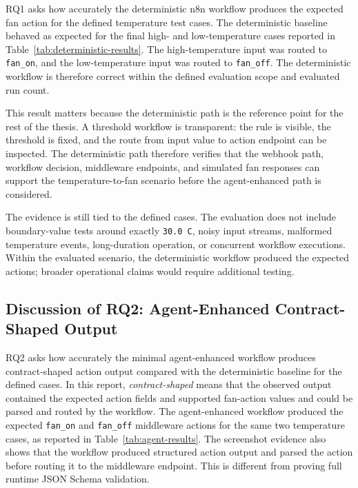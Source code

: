 RQ1 asks how accurately the deterministic n8n workflow produces the expected fan action for the defined temperature test cases. The deterministic baseline behaved as expected for the final high- and low-temperature cases reported in Table~\ref{tab:deterministic-results}. The high-temperature input was routed to \texttt{fan\_on}, and the low-temperature input was routed to \texttt{fan\_off}. The deterministic workflow is therefore correct within the defined evaluation scope and evaluated run count.

This result matters because the deterministic path is the reference point for the rest of the thesis. A threshold workflow is transparent: the rule is visible, the threshold is fixed, and the route from input value to action endpoint can be inspected. The deterministic path therefore verifies that the webhook path, workflow decision, middleware endpoints, and simulated fan responses can support the temperature-to-fan scenario before the agent-enhanced path is considered.

The evidence is still tied to the defined cases. The evaluation does not include boundary-value tests around exactly \texttt{30.0 C}, noisy input streams, malformed temperature events, long-duration operation, or concurrent workflow executions. Within the evaluated scenario, the deterministic workflow produced the expected actions; broader operational claims would require additional testing.

\subsection{Discussion of RQ2: Agent-Enhanced Contract-Shaped Output}\label{subsec:discussion-rq2-agent}

RQ2 asks how accurately the minimal agent-enhanced workflow produces contract-shaped action output compared with the deterministic baseline for the defined cases. In this report, \emph{contract-shaped} means that the observed output contained the expected action fields and supported fan-action values and could be parsed and routed by the workflow. The agent-enhanced workflow produced the expected \texttt{fan\_on} and \texttt{fan\_off} middleware actions for the same two temperature cases, as reported in Table~\ref{tab:agent-results}. The screenshot evidence also shows that the workflow produced structured action output and parsed the action before routing it to the middleware endpoint. This is different from proving full runtime JSON Schema validation.


